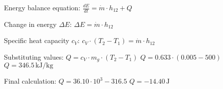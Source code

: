 Energy balance equation:  
\( \frac{dE}{dt} = \dot{m} \cdot h_{12} + Q \)  

Change in energy \( \Delta E \):  
\( \Delta E = \dot{m} \cdot h_{12} \)  

Specific heat capacity \( c_V \):  
\( c_V \cdot (T_2 - T_1) = \dot{m} \cdot h_{12} \)  

Substituting values:  
\( Q = c_V \cdot m_g \cdot (T_2 - T_1) \)  
\( Q = 0.633 \cdot (0.005 - 500) \)  
\( Q = 346.5 \, \text{kJ/kg} \)  

Final calculation:  
\( Q = 36.10 \cdot 10^3 - 316.5 \)  
\( Q = -14.40 \, \text{J} \)